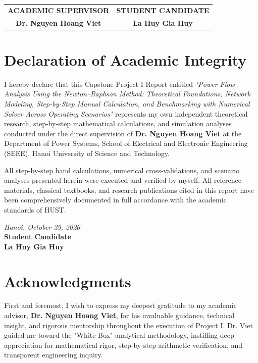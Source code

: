 \documentclass[12pt,a4paper,oneside]{report}
\begin{document}
\vspace{1.5cm}
\noindent \begin{tabular*}{\textwidth}{@{\extracolsep{\fill}}cc}
    \textbf{ACADEMIC SUPERVISOR} & \textbf{STUDENT CANDIDATE} \\[30pt]
    \textbf{Dr. Nguyen Hoang Viet} & \textbf{La Huy Gia Huy}
\end{tabular*}

\newpage

\chapter*{Declaration of Academic Integrity}

I hereby declare that this Capstone Project I Report entitled \textit{"Power Flow Analysis Using the Newton--Raphson Method: Theoretical Foundations, Network Modeling, Step-by-Step Manual Calculation, and Benchmarking with Numerical Solver Across Operating Scenarios"} represents my own independent theoretical research, step-by-step mathematical calculations, and simulation analyses conducted under the direct supervision of \textbf{Dr. Nguyen Hoang Viet} at the Department of Power Systems, School of Electrical and Electronic Engineering (SEEE), Hanoi University of Science and Technology.

All step-by-step hand calculations, numerical cross-validations, and scenario analyses presented herein were executed and verified by myself. All reference materials, classical textbooks, and research publications cited in this report have been comprehensively documented in full accordance with the academic standards of HUST.

\vspace{1.5cm}
\begin{flushright}
    \textit{Hanoi, October 29, 2026}\\[5pt]
    \textbf{Student Candidate}\\[30pt]
    \textbf{La Huy Gia Huy}
\end{flushright}

\newpage

\chapter*{Acknowledgments}

First and foremost, I wish to express my deepest gratitude to my academic advisor, \textbf{Dr. Nguyen Hoang Viet}, for his invaluable guidance, technical insight, and rigorous mentorship throughout the execution of Project I. Dr. Viet guided me toward the "White-Box" analytical methodology, instilling deep appreciation for mathematical rigor, step-by-step arithmetic verification, and transparent engineering inquiry.
\end{document}
